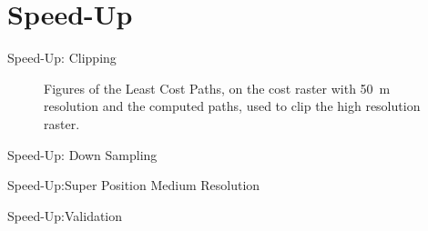 \documentclass[usenames,dvipsnames,aspectratio=169]{beamer}
\begin{document}
\section{Speed-Up}
	\begin{frame}{Speed-Up: Clipping}
		\begin{figure}
			\centering
			
			\qquad
			
			\caption{Figures of the Least Cost Paths, on the cost raster with 50~m resolution and the computed paths, used to clip the high resolution raster.}
			\label{fig:clipping}
		\end{figure}
	\end{frame}


	\begin{frame}{Speed-Up: Down Sampling}
	\end{frame}

	\begin{frame}{Speed-Up:Super Position Medium Resolution}
	\end{frame}

	\begin{frame}{Speed-Up:Validation}
	\end{frame}
\end{document}
